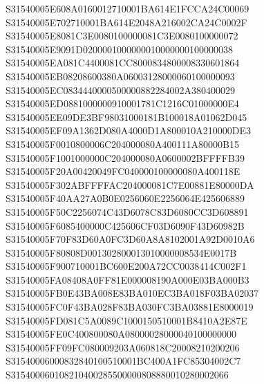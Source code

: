\documentclass[12pt,a4paper]{article}
\begin{document}
\begin{framed}
{S31540005E608A0160012710001BA614E1FCCA24C00069\newline
S31540005E702710001BA614E2048A216002CA24C0002F\newline
S31540005E8081C3E0080100000081C3E0080100000072\newline
S31540005E9091D0200001000000010000000100000038\newline
S31540005EA081C4400081CC8000834800008330601864\newline
S31540005EB08208600380A06003128000060100000093\newline
S31540005EC0834440000500000882284002A380400029\newline
S31540005ED0881000000910001781C1216C01000000E4\newline
S31540005EE09DE3BF98031000181B100018A01062D045\newline
S31540005EF09A1362D080A4000D1A800010A210000DE3\newline
S31540005F0010800006C204000080A400111A80000B15\newline
S31540005F1001000000C204000080A0600002BFFFFB39\newline
S31540005F20A00420049FC040000100000080A400118E\newline
S31540005F302ABFFFFAC204000081C7E00881E80000DA\newline
S31540005F40AA27A0B0E0256060E2256064E425606889\newline
S31540005F50C2256074C43D6078C83D6080CC3D608891\newline
S31540005F6085400000C425606CF03D6090F43D60982B\newline
S31540005F70F83D60A0FC3D60A8A8102001A92D0010A6\newline
S31540005F80808D001302800013010000008534E0017B\newline
S31540005F900710001BC600E200A72CC0038414C002F1\newline
S31540005FA08408A0FF81E000008190A000E03BA000B3\newline
S31540005FB0E43BA008E83BA010EC3BA018F03BA02037\newline
S31540005FC0F43BA028F83BA030FC3BA03881E8000019\newline
S31540005FD081C5A0089C1000150510001B8410A2E87E\newline
S31540005FE0C400800080A08000028000040100000000\newline
S31540005FF09FC080009203A060818C20008210200206\newline
S31540006000832840100510001BC400A1FC85304002C7\newline
S315400060108210400285500000808880010280002066\newline
}
\end{framed}
\end{document}
